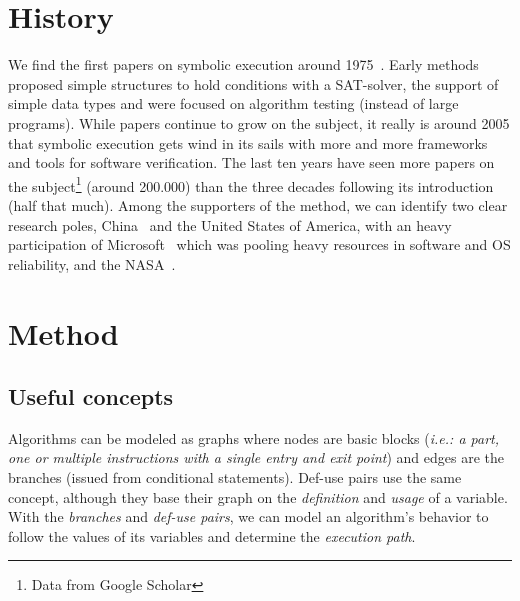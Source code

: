 \documentclass[11pt]{IEEEtran}
\begin{document}
  \section{History}
    We find the first papers on symbolic execution around 1975~\cite{newapproach}. Early methods proposed simple structures to hold conditions with a SAT-solver, the support of simple data types and were focused on algorithm testing (instead of large programs). While papers continue to grow on the subject, it really is around 2005 that symbolic execution gets wind in its sails with more and more frameworks and tools for software verification. The last ten years have seen more papers on the subject\footnote{Data from Google Scholar} (around 200.000) than the three decades following its introduction (half that much). Among the supporters of the method, we can identify two clear research poles, China~\cite{Hardware, memorytablemodel, CHEN2018118} and the United States of America, with an heavy participation of Microsoft~\cite{bouncer-securing-software-by-blocking-bad-input} which was pooling heavy resources in software and OS reliability, and the NASA~\cite{neurosymbolicexecution, DirectedIncrementalSymExe, visserWillemCorina}.

  \section{Method}
    \subsection{Useful concepts}
      Algorithms can be modeled as graphs where nodes are basic blocks (\emph{i.e.: a part, one or multiple instructions with a single entry and exit point}) and edges are the branches (issued from conditional statements). Def-use pairs use the same concept, although they base their graph on the \emph{definition} and \emph{usage} of a variable. With the \emph{branches} and \emph{def-use pairs}, we can model an algorithm's behavior to follow the values of its variables and determine the \emph{execution path}.
\end{document}
